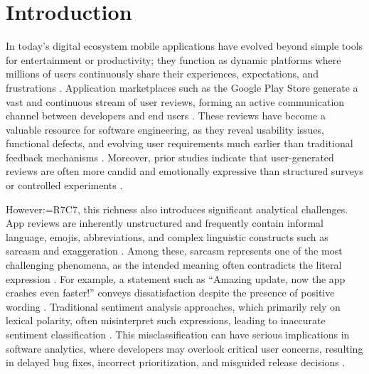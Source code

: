 \documentclass[a4paper,fleqn]{cas-sc}
\makeatletter
\newif\iftracked
\newcommand{\rv@recordone}[1]{%
  \edef\rv@i{#1}%
  \ifcsdef{rv@n@\rv@i}{}{\csgdef{rv@n@\rv@i}{0}}%
  \csxdef{rv@n@\rv@i}{\the\numexpr\csuse{rv@n@\rv@i}+1\relax}%
  \begingroup\edef\@currentlabel{\rv@i}\label{rv:\rv@i:\csuse{rv@n@\rv@i}}\endgroup}
\newcommand{\rv@record}[1]{\@for\rv@id:=#1\do{\expandafter\rv@recordone\expandafter{\rv@id}}}
\DeclareRobustCommand{\rce}[1]{\rv@record{R7C7}\iftracked{\color{rvEdit}#1}\else#1\fi}
\makeatother
\begin{document}
\section{Introduction}
\label{sec:intro}

In today's digital ecosystem mobile applications have evolved beyond simple tools for entertainment or productivity; they function as dynamic platforms where millions of users continuously share their experiences, expectations, and frustrations \citep{maalej2015bug,putri2025sarcasm,alam2025automating}. Application marketplaces such as the Google Play Store generate a vast and continuous stream of user reviews, forming an active communication channel between developers and end users \citep{ciurumelea2017analyzing,khan2025exploring}. These reviews have become a valuable resource for software engineering, as they reveal usability issues, functional defects, and evolving user requirements much earlier than traditional feedback mechanisms \citep{delima2024opinion,gambo2024extracting}. Moreover, prior studies indicate that user-generated reviews are often more candid and emotionally expressive than structured surveys or controlled experiments \citep{nguyenduc2025generative}\citep{11334541}.

However\rce{,} this richness also introduces significant analytical challenges. App reviews are inherently unstructured and frequently contain informal language, emojis, abbreviations, and complex linguistic constructs such as sarcasm and exaggeration \citep{haripriya2017survey,wang2024how}\citep{11262529}. Among these, sarcasm represents one of the most challenging phenomena, as the intended meaning often contradicts the literal expression \citep{veeramani2024harnessing}. For example, a statement such as ``Amazing update, now the app crashes even faster!'' conveys dissatisfaction despite the presence of positive wording \citep{gonzalez2011identifying,celik2025analyzing}. Traditional sentiment analysis approaches, which primarily rely on lexical polarity, often misinterpret such expressions, leading to inaccurate sentiment classification \citep{poria2016deeper}. This misclassification can have serious implications in software analytics, where developers may overlook critical user concerns, resulting in delayed bug fixes, incorrect prioritization, and misguided release decisions \citep{adedigba2025systematic}\citep{10.1145/3691621.3694951}.
\end{document}
